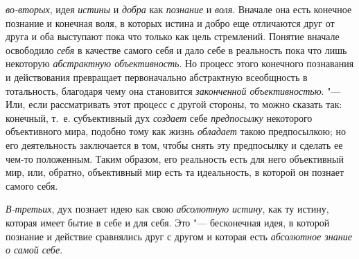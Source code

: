 {{{\em во-вторых}, идея
{\em истины} и
{\em добра} как
{\em познание} и
{\em воля}. Вначале она
есть конечное познание и конечная воля, в которых истина и добро еще
отличаются друг от друга и оба выступают пока что только как цель
стремлений. Понятие вначале освободило
{\em себя} в качестве
самого себя и дало себе в реальность пока что лишь некоторую
{\em абстрактную объективность}.
Но процесс этого конечного познавания и действования
превращает первоначально абстрактную всеобщность в тотальность, благодаря
чему она становится {\em законченной
объективностью}. "--- Или, если рассматривать этот процесс с
другой стороны, то можно сказать так: конечный, т.~е. субъективный дух
{\em создает} себе
{\em предпосылку}
некоторого объективного мира, подобно тому как жизнь
{\em обладает} такою
предпосылкою; но его деятельность заключается в том, чтобы
снять эту предпосылку и сделать ее чем-то положенным. Таким образом, его
реальность есть для него объективный мир, или, обратно, объективный мир
есть та идеальность, в которой он познает самого себя.

{\em В-третьих}, дух
познает идею как свою {\em абсолютную
истину}, как ту истину, которая имеет бытие в себе и для
себя. Это "--- бесконечная идея, в которой познание и действие
сравнялись друг с другом и которая есть
{\em абсолютное знание о самой себе}.

}}
